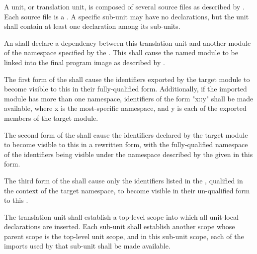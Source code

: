 \specsubitem
A unit, or translation unit, is composed of several source files as described
by . Each source file is a .
A specific sub-unit may have no declarations, but the unit shall contain at
least one declaration among its sub-units.

\specsubitem
An  shall declare a dependency between this translation
unit and another module of the namespace specified by the
 . This shall cause the named
module to be linked into the final program image as described by
.

\specsubitem
The first form of the  shall cause the identifiers
exported by the target module to become visible to this 
in their fully-qualified form. Additionally, if the imported module has more
than one namespace, identifiers of the form "x::y" shall be made available,
where x is the most-specific namespace, and y is each of the exported members
of the target module.

\specsubitem
The second form of the  shall cause the identifiers
declared by the target module to become visible to this 
in a rewritten form, with the fully-qualified namespace of the identifiers
being visible under the namespace described by the  given in
this form.


\specsubitem
The third form of the  shall cause only the
identifiers listed in the , qualified in the context
of the target namespace, to become visible in their un-qualified form to this
.


\specsubitem
The translation unit shall establish a top-level scope into which all
unit-local declarations are inserted. Each sub-unit shall establish another
scope whose parent scope is the top-level unit scope, and in this sub-unit
scope, each of the imports used by that sub-unit shall be made available.

